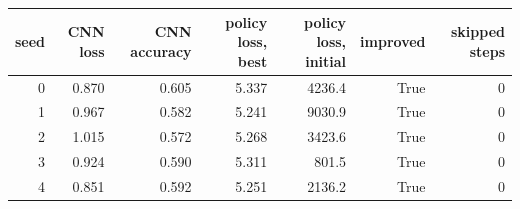 \begin{tabular}{rrrrrrr}
\toprule
seed & CNN loss & CNN accuracy & policy loss, best & policy loss, initial & improved & skipped steps \\
\midrule
0 & 0.870 & 0.605 & 5.337 & 4236.4 & True & 0 \\
1 & 0.967 & 0.582 & 5.241 & 9030.9 & True & 0 \\
2 & 1.015 & 0.572 & 5.268 & 3423.6 & True & 0 \\
3 & 0.924 & 0.590 & 5.311 & 801.5 & True & 0 \\
4 & 0.851 & 0.592 & 5.251 & 2136.2 & True & 0 \\
\bottomrule
\end{tabular}